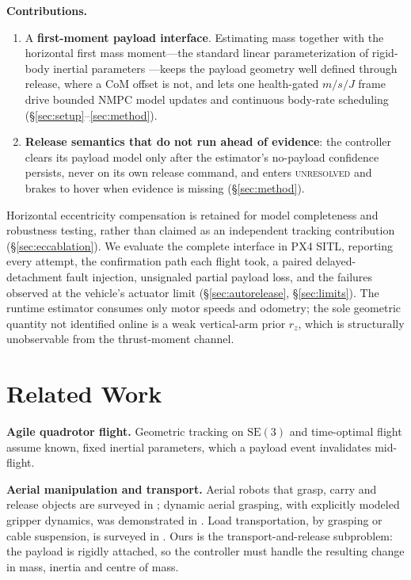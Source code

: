 \documentclass[conference]{IEEEtran}
\begin{document}
\textbf{Contributions.}
\begin{enumerate}
\item A \textbf{first-moment payload interface}. Estimating mass together with the horizontal
first mass moment---the standard linear parameterization of rigid-body inertial parameters
\cite{atkeson1986}---keeps the payload geometry well defined through release, where a CoM
offset is not, and lets one health-gated $m/s/J$ frame drive bounded NMPC model updates and
continuous body-rate scheduling (\S\ref{sec:setup}--\ref{sec:method}).
\item \textbf{Release semantics that do not run ahead of evidence}: the controller clears its
payload model only after the estimator's no-payload confidence persists, never on its own
release command, and enters \textsc{unresolved} and brakes to hover when evidence is missing
(\S\ref{sec:method}).
\end{enumerate}
Horizontal eccentricity compensation is retained for model completeness and
robustness testing, rather than claimed as an independent tracking contribution
(\S\ref{sec:eccablation}).
We evaluate the complete interface in PX4 SITL, reporting every attempt, the confirmation path
each flight took, a paired delayed-detachment fault injection, unsignaled partial payload loss,
and the failures observed at the vehicle's actuator limit (\S\ref{sec:autorelease},
\S\ref{sec:limits}).
The runtime estimator consumes only motor speeds and odometry; the sole geometric quantity not
identified online is a weak vertical-arm prior $r_z$, which is structurally unobservable from
the thrust-moment channel.

\section{Related Work}
\textbf{Agile quadrotor flight.} Geometric tracking on $\mathrm{SE}(3)$ \cite{lee2010} and
time-optimal flight \cite{foehn2021} assume known, fixed inertial parameters, which a payload
event invalidates mid-flight.

\textbf{Aerial manipulation and transport.} Aerial robots that grasp, carry and release
objects are surveyed in \cite{ollero2022}; dynamic aerial grasping, with explicitly modeled
gripper dynamics, was demonstrated in \cite{thomas2014}.
Load transportation, by grasping or cable suspension, is surveyed in \cite{villa2020}. Ours is
the transport-and-release subproblem: the payload is rigidly attached, so the controller must
handle the resulting change in mass, inertia and centre of mass.
\end{document}
